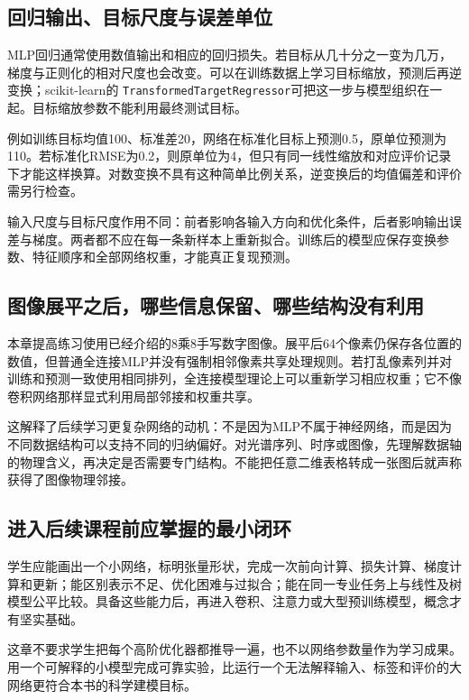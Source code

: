 \subsection{回归输出、目标尺度与误差单位}
MLP回归通常使用数值输出和相应的回归损失。若目标从几十分之一变为几万，梯度与正则化的相对尺度也会改变。可以在训练数据上学习目标缩放，预测后再逆变换；scikit-learn的 \texttt{TransformedTargetRegressor}可把这一步与模型组织在一起。目标缩放参数不能利用最终测试目标。

例如训练目标均值100、标准差20，网络在标准化目标上预测0.5，原单位预测为110。若标准化RMSE为0.2，则原单位为4，但只有同一线性缩放和对应评价记录下才能这样换算。对数变换不具有这种简单比例关系，逆变换后的均值偏差和评价需另行检查。

输入尺度与目标尺度作用不同：前者影响各输入方向和优化条件，后者影响输出误差与梯度。两者都不应在每一条新样本上重新拟合。训练后的模型应保存变换参数、特征顺序和全部网络权重，才能真正复现预测。

\subsection{图像展平之后，哪些信息保留、哪些结构没有利用}
本章提高练习使用已经介绍的8乘8手写数字图像。展平后64个像素仍保存各位置的数值，但普通全连接MLP并没有强制相邻像素共享处理规则。若打乱像素列并对训练和预测一致使用相同排列，全连接模型理论上可以重新学习相应权重；它不像卷积网络那样显式利用局部邻接和权重共享。

这解释了后续学习更复杂网络的动机：不是因为MLP不属于神经网络，而是因为不同数据结构可以支持不同的归纳偏好。对光谱序列、时序或图像，先理解数据轴的物理含义，再决定是否需要专门结构。不能把任意二维表格转成一张图后就声称获得了图像物理邻接。

\subsection{进入后续课程前应掌握的最小闭环}
学生应能画出一个小网络，标明张量形状，完成一次前向计算、损失计算、梯度计算和更新；能区别表示不足、优化困难与过拟合；能在同一专业任务上与线性及树模型公平比较。具备这些能力后，再进入卷积、注意力或大型预训练模型，概念才有坚实基础。

这章不要求学生把每个高阶优化器都推导一遍，也不以网络参数量作为学习成果。用一个可解释的小模型完成可靠实验，比运行一个无法解释输入、标签和评价的大网络更符合本书的科学建模目标。

